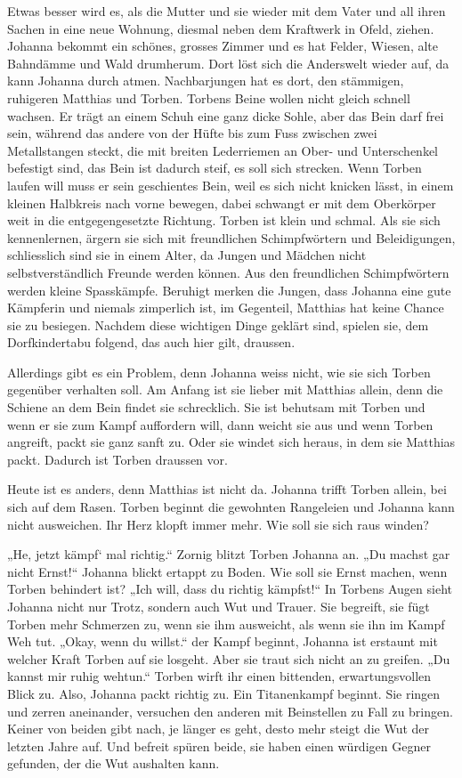 \documentclass[10pt,a5paper]{book}
\begin{document}
Etwas besser wird es, als die Mutter und sie wieder mit dem Vater und all ihren Sachen in eine neue Wohnung, diesmal neben dem Kraftwerk in Ofeld, ziehen. Johanna bekommt ein schönes, grosses Zimmer und es hat Felder, Wiesen, alte Bahndämme und Wald drumherum. Dort löst sich die Anderswelt wieder auf, da kann Johanna durch atmen. Nachbarjungen hat es dort, den stämmigen, ruhigeren Matthias und Torben. Torbens Beine wollen nicht gleich schnell wachsen. Er trägt an einem Schuh eine ganz dicke Sohle, aber das Bein darf frei sein, während das andere von der Hüfte bis zum Fuss zwischen zwei Metallstangen steckt, die mit breiten Lederriemen an Ober- und Unterschenkel befestigt sind, das Bein ist dadurch steif, es soll sich strecken. Wenn Torben laufen will muss er sein geschientes Bein, weil es sich nicht knicken lässt, in einem kleinen Halbkreis nach vorne bewegen, dabei schwangt er mit dem Oberkörper weit in die entgegengesetzte Richtung. Torben ist klein und schmal. Als sie sich kennenlernen, ärgern sie sich mit freundlichen Schimpfwörtern und Beleidigungen, schliesslich sind sie in einem Alter, da Jungen und Mädchen nicht selbstverständlich Freunde werden können. Aus den freundlichen Schimpfwörtern werden kleine Spasskämpfe. Beruhigt merken die Jungen, dass Johanna eine gute Kämpferin und niemals zimperlich ist, im Gegenteil, Matthias hat keine Chance sie zu besiegen. Nachdem diese wichtigen Dinge geklärt sind, spielen sie, dem Dorfkindertabu folgend, das auch hier gilt, draussen. 

Allerdings gibt es ein Problem, denn Johanna weiss nicht, wie sie sich Torben gegenüber verhalten soll. Am Anfang ist sie lieber mit Matthias allein, denn die Schiene an dem Bein findet sie schrecklich. Sie ist behutsam mit Torben und wenn er sie zum Kampf auffordern will, dann weicht sie aus und wenn Torben angreift, packt sie ganz sanft zu. Oder sie windet sich heraus, in dem sie Matthias packt. Dadurch ist Torben draussen vor.

Heute ist es anders, denn Matthias ist nicht da. Johanna trifft Torben allein, bei sich auf dem Rasen. Torben beginnt die gewohnten Rangeleien und Johanna kann nicht ausweichen. Ihr Herz klopft immer mehr. Wie soll sie sich raus winden? 

„He, jetzt kämpf` mal richtig.“ Zornig blitzt Torben Johanna an. „Du machst gar nicht Ernst!“ Johanna blickt ertappt zu Boden. Wie soll sie Ernst machen, wenn Torben behindert ist? „Ich will, dass du richtig kämpfst!“ In Torbens Augen sieht Johanna nicht nur Trotz, sondern auch Wut und Trauer. Sie begreift, sie fügt Torben mehr Schmerzen zu, wenn sie ihm ausweicht, als wenn sie ihn im Kampf Weh tut. „Okay, wenn du willst.“ der Kampf beginnt, Johanna ist erstaunt mit welcher Kraft Torben auf sie losgeht. Aber sie traut sich nicht an zu greifen. „Du kannst mir ruhig wehtun.“ Torben wirft ihr einen bittenden, erwartungsvollen Blick zu. Also, Johanna packt richtig zu. Ein Titanenkampf beginnt. Sie ringen und zerren aneinander, versuchen den anderen mit Beinstellen zu Fall zu bringen. Keiner von beiden gibt nach, je länger es geht, desto mehr steigt die Wut der letzten Jahre auf. Und befreit spüren beide, sie haben einen würdigen Gegner gefunden, der die Wut aushalten kann.
\end{document}

